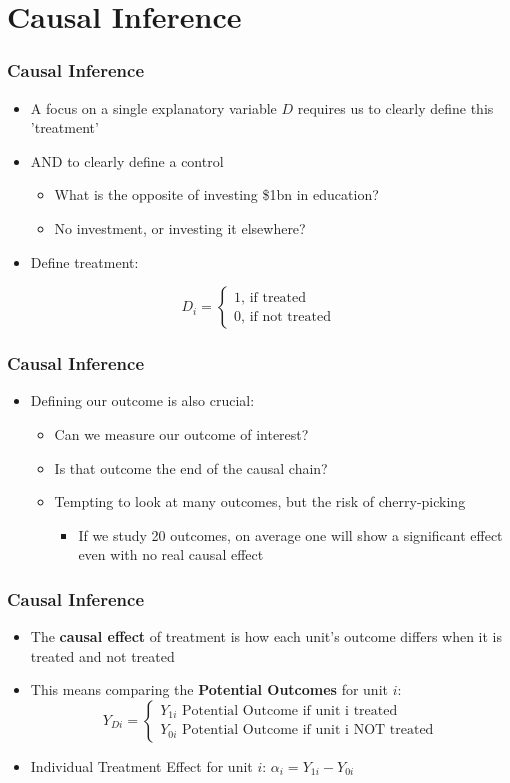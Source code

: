 \documentclass[xcolor=x11names,compress]{beamer}\usepackage[]{graphicx}\usepackage[]{color}
\renewcommand{\(}{\begin{columns}}
\renewcommand{\)}{\end{columns}}
\newcommand{\<}[1]{\begin{column}{#1}}
\renewcommand{\>}{\end{column}}
\begin{document}
\section{Causal Inference}

\begin{frame}
\frametitle{Causal Inference}
\begin{itemize}
\item A focus on a single explanatory variable $D$ requires us to clearly define this 'treatment' 
\pause
\item AND to clearly define a control
\pause
\begin{itemize}
\item What is the opposite of investing \$1bn in education?
\pause
\item No investment, or investing it elsewhere?
\pause
\end{itemize}
\item Define treatment:
\end{itemize}
\[D_i = 
\begin{cases}
1 \text{, if treated} \\
0 \text{, if not treated}
\end{cases}
\]
\end{frame}

\begin{frame}
\frametitle{Causal Inference}
\begin{itemize}
\item Defining our outcome is also crucial:
\pause
\begin{itemize}
\item Can we measure our outcome of interest?
\pause
\item Is that outcome the end of the causal chain?
\pause
\item Tempting to look at many outcomes, but the risk of cherry-picking
\pause
\begin{itemize}
\item If we study 20 outcomes, on average one will show a significant effect even with no real causal effect
\end{itemize}
\end{itemize}
\end{itemize}
\end{frame}

\begin{frame}
\frametitle{Causal Inference}
\begin{itemize}
\item The \textbf{causal effect} of treatment is how each unit's outcome differs when it is treated and not treated
\pause
\item This means comparing the \textbf{Potential Outcomes} for unit $i$:
\[
Y_{Di} = 
\begin{cases}
Y_{1i}\text{   Potential Outcome if unit i treated} \\
Y_{0i}\text{   Potential Outcome if unit i NOT treated}
\end{cases}
\]
\pause
\item Individual Treatment Effect for unit $i$: $\alpha_i = Y_{1i} - Y_{0i}$
\end{itemize}
\end{frame}
\end{document}
